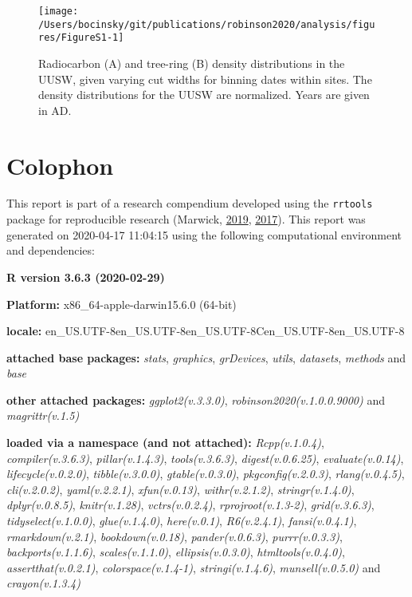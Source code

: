 \documentclass[
]{article}
\begin{document}
\begin{figure}

{\centering \texttt{[image: /Users/bocinsky/git/publications/robinson2020/analysis/figures/FigureS1-1]} 

}

\caption{Radiocarbon (A) and tree-ring (B) density distributions in the UUSW, given varying cut widths for binning dates within sites. The density distributions for the UUSW are normalized. Years are given in AD.}\label{fig:FigureS1}
\end{figure}

\newpage

\hypertarget{colophon}{%
\section*{Colophon}\label{colophon}}

This report is part of a research compendium developed using the \texttt{rrtools} package for reproducible research (Marwick, \protect\hyperlink{ref-rrtools}{2019}, \protect\hyperlink{ref-Marwick2017}{2017}). This report was generated on 2020-04-17 11:04:15 using the following computational environment and dependencies:

\textbf{R version 3.6.3 (2020-02-29)}

\textbf{Platform:} x86\_64-apple-darwin15.6.0 (64-bit)

\textbf{locale:}
en\_US.UTF-8\textbar\textbar en\_US.UTF-8\textbar\textbar en\_US.UTF-8\textbar\textbar C\textbar\textbar en\_US.UTF-8\textbar\textbar en\_US.UTF-8

\textbf{attached base packages:}
\emph{stats}, \emph{graphics}, \emph{grDevices}, \emph{utils}, \emph{datasets}, \emph{methods} and \emph{base}

\textbf{other attached packages:}
\emph{ggplot2(v.3.3.0)}, \emph{robinson2020(v.1.0.0.9000)} and \emph{magrittr(v.1.5)}

\textbf{loaded via a namespace (and not attached):}
\emph{Rcpp(v.1.0.4)}, \emph{compiler(v.3.6.3)}, \emph{pillar(v.1.4.3)}, \emph{tools(v.3.6.3)}, \emph{digest(v.0.6.25)}, \emph{evaluate(v.0.14)}, \emph{lifecycle(v.0.2.0)}, \emph{tibble(v.3.0.0)}, \emph{gtable(v.0.3.0)}, \emph{pkgconfig(v.2.0.3)}, \emph{rlang(v.0.4.5)}, \emph{cli(v.2.0.2)}, \emph{yaml(v.2.2.1)}, \emph{xfun(v.0.13)}, \emph{withr(v.2.1.2)}, \emph{stringr(v.1.4.0)}, \emph{dplyr(v.0.8.5)}, \emph{knitr(v.1.28)}, \emph{vctrs(v.0.2.4)}, \emph{rprojroot(v.1.3-2)}, \emph{grid(v.3.6.3)}, \emph{tidyselect(v.1.0.0)}, \emph{glue(v.1.4.0)}, \emph{here(v.0.1)}, \emph{R6(v.2.4.1)}, \emph{fansi(v.0.4.1)}, \emph{rmarkdown(v.2.1)}, \emph{bookdown(v.0.18)}, \emph{pander(v.0.6.3)}, \emph{purrr(v.0.3.3)}, \emph{backports(v.1.1.6)}, \emph{scales(v.1.1.0)}, \emph{ellipsis(v.0.3.0)}, \emph{htmltools(v.0.4.0)}, \emph{assertthat(v.0.2.1)}, \emph{colorspace(v.1.4-1)}, \emph{stringi(v.1.4.6)}, \emph{munsell(v.0.5.0)} and \emph{crayon(v.1.3.4)}
\end{document}
